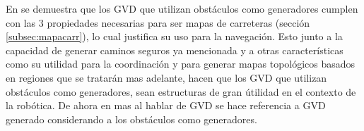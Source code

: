 En \cite{choset2005principles} se demuestra que los GVD que utilizan obstáculos como generadores cumplen con las 3 propiedades necesarias para ser mapas de carreteras (sección \ref{subsec:mapacarr}), lo cual justifica su uso para la navegación. Esto junto a la capacidad de generar caminos seguros ya mencionada y a otras características como su utilidad para la coordinación y para generar mapas topológicos basados en regiones que se tratarán mas adelante, hacen que los GVD que utilizan obstáculos como generadores, sean estructuras de gran útilidad en el contexto de la  robótica. De ahora en mas al hablar de GVD se hace referencia a GVD generado considerando a los obstáculos como generadores.






